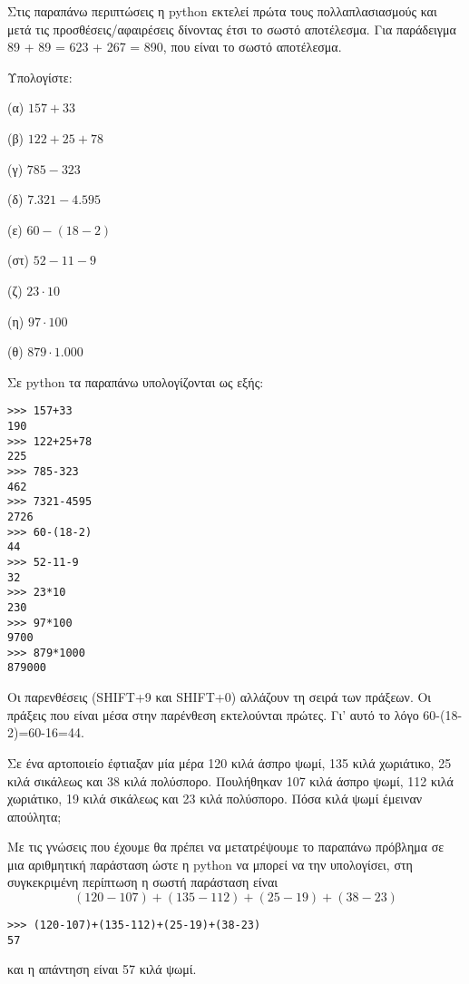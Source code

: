 Στις παραπάνω περιπτώσεις η python εκτελεί πρώτα τους πολλαπλασιασμούς και μετά τις προσθέσεις/αφαιρέσεις δίνοντας έτσι το σωστό αποτέλεσμα. Για παράδειγμα 89 + 89 = 623 + 267 = 890, που είναι το σωστό αποτέλεσμα.

\begin{exercise}
Υπολογίστε:

(α)  $157 + 33$ 

(β)  $122 + 25 + 78$

(γ)  $785 - 323$

(δ)  $7.321 - 4.595$

(ε)  $60 - (18 - 2)$

(στ) $52 - 11 -9$

(ζ)  $23 \cdot 10$

(η)  $97 \cdot 100$

(θ)  $879 \cdot 1.000$
\end{exercise}
Σε python τα παραπάνω υπολογίζονται ως εξής:
\begin{lstlisting}
>>> 157+33
190
>>> 122+25+78
225
>>> 785-323
462
>>> 7321-4595
2726
>>> 60-(18-2)
44
>>> 52-11-9
32
>>> 23*10
230
>>> 97*100
9700
>>> 879*1000
879000
\end{lstlisting}
Οι παρενθέσεις (SHIFT+9 και SHIFT+0) αλλάζουν τη σειρά των πράξεων. Οι πράξεις που είναι μέσα στην παρένθεση εκτελούνται πρώτες. Γι' αυτό το λόγο 60-(18-2)=60-16=44.

\begin{exercise}
Σε ένα αρτοποιείο έφτιαξαν μία μέρα 120 κιλά άσπρο ψωμί, 135 κιλά χωριάτικο, 25 κιλά σικάλεως και 38 κιλά πολύσπορο. Πουλήθηκαν 107 κιλά άσπρο ψωμί, 112 κιλά χωριάτικο, 19 κιλά σικάλεως και 23 κιλά πολύσπορο. Πόσα κιλά ψωμί έμειναν απούλητα;
\end{exercise}
Με τις γνώσεις που έχουμε θα πρέπει να μετατρέψουμε το παραπάνω πρόβλημα σε μια αριθμητική παράσταση ώστε η python να μπορεί να την υπολογίσει, στη συγκεκριμένη περίπτωση η σωστή παράσταση είναι $$(120-107)+(135-112)+(25-19)+(38-23)$$
\begin{lstlisting}
>>> (120-107)+(135-112)+(25-19)+(38-23)
57
\end{lstlisting}
και η απάντηση είναι 57 κιλά ψωμί.


